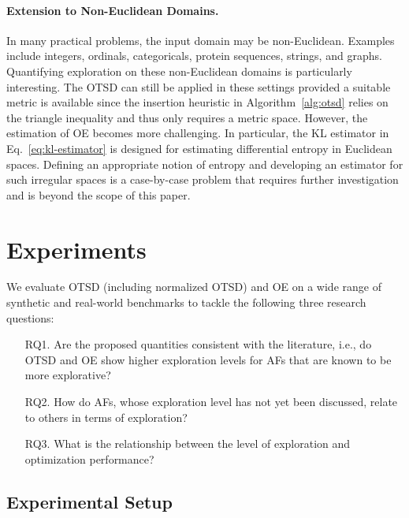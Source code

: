 \documentclass[accepted]{uai2025}
\begin{document}
\paragraph{Extension to Non-Euclidean Domains.}
In many practical problems, the input domain may be non-Euclidean. Examples include integers, ordinals, categoricals, protein sequences, strings, and graphs. Quantifying exploration on these non-Euclidean domains is particularly interesting. The \ac{OTSD} can still be applied in these settings provided a suitable metric is available since the insertion heuristic in Algorithm~\ref{alg:otsd} relies on the triangle inequality and thus only requires a metric space. 
However, the estimation of \ac{OE} becomes more challenging. In particular, the \ac{KL} estimator in Eq.~\eqref{eq:kl-estimator} is designed for estimating differential entropy in Euclidean spaces. Defining an appropriate notion of entropy and developing an estimator for such irregular spaces is a case-by-case problem that requires further investigation and is beyond the scope of this paper.


\section{Experiments}
\label{sec:experiment}
We evaluate \ac{OTSD} (including normalized \ac{OTSD}) and \ac{OE} on a wide range of synthetic and real-world benchmarks to tackle the following three research questions:
\begin{enumerate}[align=left, leftmargin=*]
    \item[RQ1.] Are the proposed quantities consistent with the literature, i.e., do \ac{OTSD} and \ac{OE} show higher exploration levels for \acp{AF} that are known to be more explorative?
    \item[RQ2.] How do \acp{AF}, whose exploration level has not yet been discussed, relate to others in terms of exploration?
    \item[RQ3.] What is the relationship between the level of exploration and optimization performance?
\end{enumerate}

\subsection{Experimental Setup}
\end{document}
